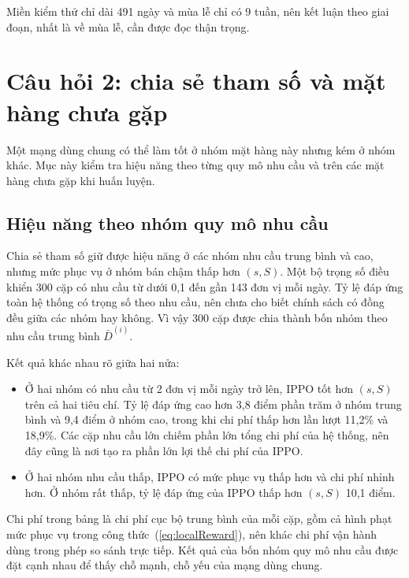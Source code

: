 Miền kiểm thử chỉ dài 491 ngày và mùa lễ chỉ có 9 tuần, nên kết luận theo giai đoạn, nhất là về mùa lễ, cần được đọc thận trọng.

\section{Câu hỏi 2: chia sẻ tham số và mặt hàng chưa gặp}
\label{sec:cau2}

Một mạng dùng chung có thể làm tốt ở nhóm mặt hàng này nhưng kém ở nhóm khác. Mục này kiểm tra hiệu năng theo từng quy mô nhu cầu và trên các mặt hàng chưa gặp khi huấn luyện.

\subsection{Hiệu năng theo nhóm quy mô nhu cầu}
\label{subsec:tongQuatHoa}

Chia sẻ tham số giữ được hiệu năng ở các nhóm nhu cầu trung bình và cao, nhưng mức phục vụ ở nhóm bán chậm thấp hơn $(s, S)$. Một bộ trọng số điều khiển 300 cặp có nhu cầu từ dưới 0,1 đến gần 143 đơn vị mỗi ngày. Tỷ lệ đáp ứng toàn hệ thống có trọng số theo nhu cầu, nên chưa cho biết chính sách có đồng đều giữa các nhóm hay không. Vì vậy 300 cặp được chia thành bốn nhóm theo nhu cầu trung bình $\bar{D}^{(i)}$.

Kết quả khác nhau rõ giữa hai nửa:
\begin{itemize}
    \item Ở hai nhóm có nhu cầu từ 2 đơn vị mỗi ngày trở lên, IPPO tốt hơn $(s, S)$ trên cả hai tiêu chí. Tỷ lệ đáp ứng cao hơn 3,8 điểm phần trăm ở nhóm trung bình và 9,4 điểm ở nhóm cao, trong khi chi phí thấp hơn lần lượt 11,2\% và 18,9\%. Các cặp nhu cầu lớn chiếm phần lớn tổng chi phí của hệ thống, nên đây cũng là nơi tạo ra phần lớn lợi thế chi phí của IPPO.
    \item Ở hai nhóm nhu cầu thấp, IPPO có mức phục vụ thấp hơn và chi phí nhỉnh hơn. Ở nhóm rất thấp, tỷ lệ đáp ứng của IPPO thấp hơn $(s, S)$ 10,1 điểm.
\end{itemize}

Chi phí trong bảng là chi phí cục bộ trung bình của mỗi cặp, gồm cả hình phạt mức phục vụ trong công thức~(\ref{eq:localReward}), nên khác chi phí vận hành dùng trong phép so sánh trực tiếp. Kết quả của bốn nhóm quy mô nhu cầu được đặt cạnh nhau để thấy chỗ mạnh, chỗ yếu của mạng dùng chung.

